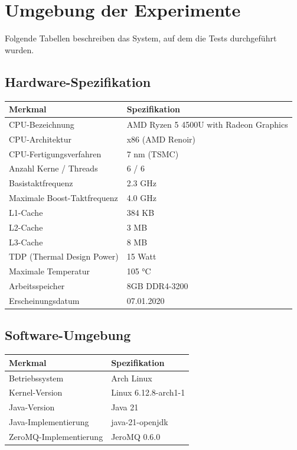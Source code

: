 \documentclass[12pt]{article}
\date{}
\begin{document}
	
\section*{Umgebung der Experimente}
Folgende Tabellen beschreiben das System, auf dem die Tests durchgeführt wurden.
\subsection*{Hardware-Spezifikation}
\begin{table}[h]
	\centering
	\begin{tabular}{|l|l|}
		\hline
		\textbf{Merkmal} & \textbf{Spezifikation} \\
		\hline
		CPU-Bezeichnung & AMD Ryzen 5 4500U with Radeon Graphics\\
		CPU-Architektur & x86 (AMD Renoir) \\
		CPU-Fertigungsverfahren & 7 nm (TSMC) \\
		\hline
		Anzahl Kerne / Threads & 6 / 6 \\
		Basistaktfrequenz & 2.3 GHz \\
		Maximale Boost-Taktfrequenz & 4.0 GHz \\
		\hline
		L1-Cache & 384 KB \\
		L2-Cache & 3 MB \\
		L3-Cache & 8 MB \\
		\hline
		TDP (Thermal Design Power) & 15 Watt \\
		Maximale Temperatur & 105 °C \\
		\hline
		Arbeitsspeicher & 8GB DDR4-3200 \\
		\hline
		Erscheinungsdatum & 07.01.2020 \\
		\hline
	\end{tabular}
\end{table}

\subsection*{Software-Umgebung}
\begin{table}[h]
	\centering
	\begin{tabular}{|l|l|}
		\hline
		\textbf{Merkmal} & \textbf{Spezifikation} \\
		\hline
		Betriebssystem & Arch Linux\\
		Kernel-Version & Linux 6.12.8-arch1-1\\
		\hline
		Java-Version & Java 21\\
		Java-Implementierung & java-21-openjdk\\
		\hline
		ZeroMQ-Implementierung & JeroMQ 0.6.0\\
		\hline
	\end{tabular}
\end{table}
\end{document}
